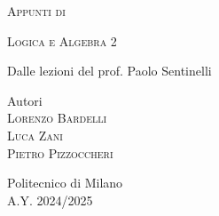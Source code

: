 \documentclass[10pt,a4paper,twoside]{book}
\begin{document}
\frontmatter

\pagestyle{empty}

\hypertarget{mytitlepage}{}

\vspace*{\fill}
\begin{center}
    {\large \textsc{Appunti di}}\\

    \vspace*{0.4cm}

    {\Huge
        \textsc{Logica e Algebra 2}}\\

    \vspace*{1cm}

    {\large Dalle lezioni del prof. Paolo Sentinelli}\\

    \vspace*{1cm}

    Autori\\
    \vspace*{0.1cm}
    \textsc{Lorenzo Bardelli}\\
    \textsc{Luca Zani}\\
    \textsc{Pietro Pizzoccheri}\\

    \vspace*{1cm}

    Politecnico di Milano\\A.Y. 2024/2025
\end{center}
\vspace*{\fill}
\clearpage

\hypertarget{mycopyright}{}

\clearpage

\cleardoublepage
\pagestyle{toc}
\hypertarget{mytoc}{}
\bookmark[dest=mytoc,level=chapter]{\contentsname}
\tableofcontents
\cleardoublepage

\pagestyle{fancy}
\mainmatter






















\cleardoublepage
\end{document}
